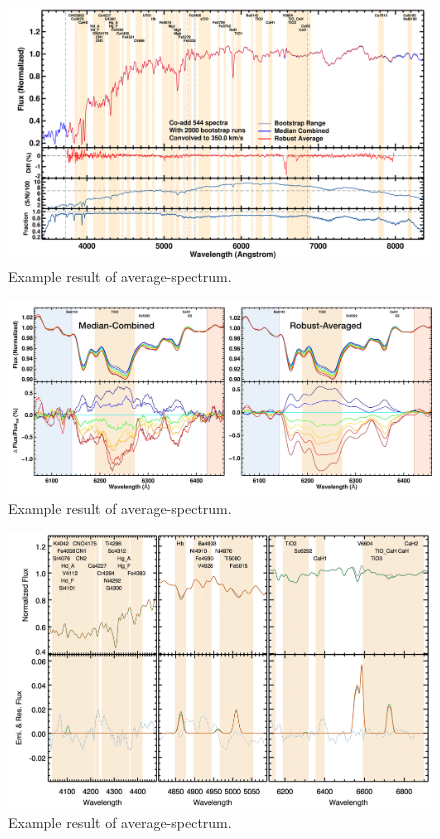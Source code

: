 \documentclass[preprint]{aastex}
\begin{document}
\begin{CJK*}{UTF8}{gbsn}
\clearpage
{}
\begin{figure}
    \centering 
    \includegraphics[width=19cm]{figure/fig2.png}
    \caption{
    Example result of average-spectrum. 
    }
    \label{figure:2}
\end{figure}

\clearpage
{}
\begin{figure}
    \centering 
    \includegraphics[width=19cm]{figure/fig3.png}
    \caption{
    Example result of average-spectrum. 
    }
    \label{figure:3}
\end{figure}

\clearpage
{}
\begin{figure}
    \centering 
    \includegraphics[width=19cm]{figure/fig4.png}
    \caption{
    Example result of average-spectrum. 
    }
    \label{figure:4}
\end{figure}


\end{CJK*}
\end{document}
